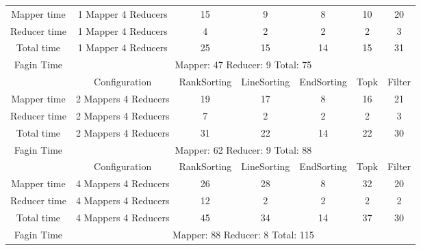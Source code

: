 \documentclass[a4paper]{article}
\begin{document}
\begin{table}[htbp]
\begin{center}
\begin{tabular}{|c|c|c|c|c|c|c|}
            \hline
            Mapper time & 1 Mapper 4 Reducers & 15 & 9 & 8 & 10 & 20  \\
            Reducer time & 1 Mapper 4 Reducers & 4 & 2 & 2 & 2 & 3  \\
            Total time & 1 Mapper 4 Reducers & 25 & 15 & 14 & 15 & 31 \\
            \hline
            Fagin Time & \multicolumn{6}{|c|}{Mapper: 47 Reducer: 9 Total: 75}  \\
            \hline
            \hline
             & Configuration & RankSorting & LineSorting & EndSorting & Topk & Filter  \\
            \hline
            Mapper time & 2 Mappers 4 Reducers & 19 & 17 & 8 & 16 & 21  \\
            Reducer time & 2 Mappers 4 Reducers & 7 & 2 & 2 & 2 & 3  \\
            Total time & 2 Mappers 4 Reducers & 31 & 22 & 14 & 22 & 30 \\
            \hline
            Fagin Time & \multicolumn{6}{|c|}{Mapper: 62 Reducer: 9 Total: 88}  \\
            \hline
            \hline
             & Configuration & RankSorting & LineSorting & EndSorting & Topk & Filter  \\
            \hline
            Mapper time & 4 Mappers 4 Reducers & 26 & 28 & 8 & 32 & 20  \\
            Reducer time & 4 Mappers 4 Reducers & 12 & 2 & 2 & 2 & 2   \\
            Total time & 4 Mappers 4 Reducers & 45 & 34 & 14 & 37 & 30 \\
            \hline
            Fagin Time & \multicolumn{6}{|c|}{Mapper: 88 Reducer: 8 Total: 115}  \\
            \hline
        \end{tabular}
    \end{center}
\end{table}
\end{document}
